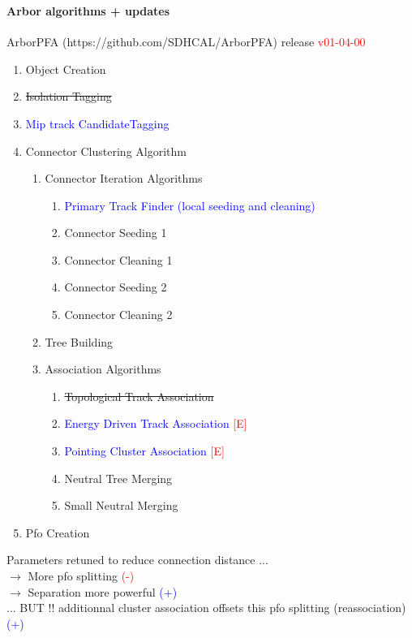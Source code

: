 \documentclass[8pt]{beamer}
\begin{document}
  \begin{frame}
  \frametitle{\secname}
  \framesubtitle{Arbor algorithms + updates}
  
  ArborPFA (https://github.com/SDHCAL/ArborPFA) release \textcolor{red}{v01-04-00} \\ \pause

    \begin{enumerate}
      \item Object Creation \pause
      \item \sout{Isolation Tagging}
      \item \textcolor{blue}{Mip track CandidateTagging}\pause
      \item Connector Clustering Algorithm\pause
      \begin{enumerate}
        \item Connector Iteration Algorithms\pause
        \begin{enumerate}
          \item \textcolor{blue}{Primary Track Finder (local seeding and cleaning)}\pause
          \item Connector Seeding 1\pause
          \item Connector Cleaning 1\pause
          \item Connector Seeding 2\pause
          \item Connector Cleaning 2\pause
        \end{enumerate}
        \item Tree Building\pause
        \item Association Algorithms\pause
        \begin{enumerate}
          \item \sout{Topological Track Association}
          \item \textcolor{blue}{Energy Driven Track Association} \textcolor{red}{[E]} \pause
          \item \textcolor{blue}{Pointing Cluster Association} \textcolor{red}{[E]} \pause
          \item Neutral Tree Merging\pause
          \item Small Neutral Merging\pause
        \end{enumerate}
      \end{enumerate}
      \item Pfo Creation \pause
    \end{enumerate}
    
    Parameters retuned to reduce connection distance ... \\
    $\rightarrow$ More pfo splitting \textcolor{red}{(-)} \\
    $\rightarrow$ Separation more powerful \textcolor{blue}{(+)} \\
    ... BUT !! additionnal cluster association offsets this pfo splitting (reassociation) \textcolor{blue}{(+)}
   
  \end{frame}
  
\end{document}
